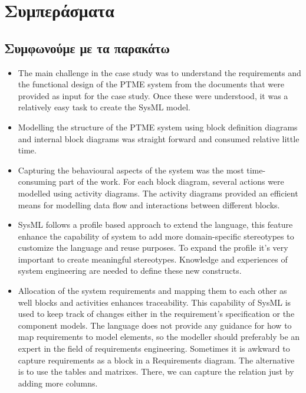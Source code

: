 \documentclass[a4paper,12pt,twoside]{report}
\begin{document}
{%
	\chapter{Συμπεράσματα}
		\label{κεφ.:Συμπεράσματα}

		\section{Συμφωνούμε με τα παρακάτω}
			\begin{itemize}
				\item The main challenge in the case study was to understand the requirements and the functional design of the PTME system from the documents that were provided as input for the case study. Once these were understood, it was a relatively easy task to create the SysML model. \cite{SMSpacecraft}
				\item Modelling the structure of the PTME system using block definition diagrams and internal block diagrams was straight forward and consumed relative little time. \cite{SMSpacecraft}
				\item Capturing the behavioural aspects of the system was the most time-consuming part of the work. For each block diagram, several actions were modelled using activity diagrams. The activity diagrams provided an efficient means for modelling data flow and interactions between different blocks.  \cite{SMSpacecraft}
				\item  SysML follows a profile based approach to extend the language, this feature enhance the capability of system to add more domain-specific stereotypes to customize the language and reuse purposes. To expand the profile it’s very important to create meaningful stereotypes. Knowledge and experiences of system engineering are needed to define these new constructs. \cite{SMSpacecraft}
				\item Allocation of the system requirements and mapping them to each other as well blocks and activities enhances traceability. This capability of SysML is used to keep track of changes either in the requirement’s specification or the component models. The language does not provide any guidance for how to map requirements to model elements, so the modeller should preferably be an expert in the field of requirements engineering. Sometimes it is awkward to capture requirements as a block in a Requirements diagram. The alternative is to use the tables and matrixes. There, we can capture the relation just by adding more columns. \cite{SMSpacecraft}

\end{itemize}}
\end{document}
